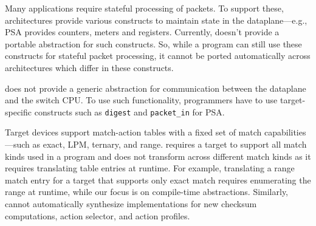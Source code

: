 \documentclass[letterpaper,twocolumn,10pt]{article}
\begin{document}
Many applications require stateful processing of packets. To support
these, architectures provide various constructs to maintain state in
the dataplane---e.g., PSA provides counters, meters and registers.
Currently, \uarch doesn't provide a portable abstraction for such
constructs. So, while a \ulang program can still use these constructs
for stateful packet processing, it cannot be ported automatically
across architectures which differ in these constructs.

\uarch does not provide a generic abstraction for communication
between the dataplane and the switch CPU. To use such functionality,
programmers have to use target-specific constructs such as
\texttt{digest} and \texttt{packet\_in} for PSA.

Target devices support match-action tables with a fixed set of match
capabilities---such as exact, LPM, ternary, and range. \ulang requires
a target to support all match kinds used in a program and \ucomp does
not transform across different match kinds as it requires translating
table entries at runtime. For example, translating a range match entry
for a target that supports only exact match requires enumerating the
range at runtime, while our focus is on compile-time abstractions.
Similarly, \ulang cannot automatically synthesize implementations for
new checksum computations, action selector, and action profiles.


\end{document}
